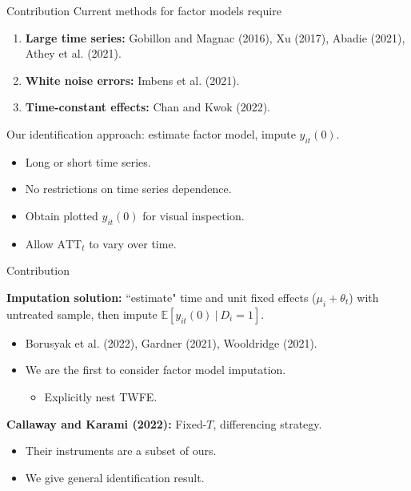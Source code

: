 \documentclass{beamer}
\newcommand{\1}{\mathds{1}} %
\newcommand{\condexpec}[2]{\mathbb{E}\left[#1 \ \vert \ #2\right]}
\begin{document}

\begin{frame}{Contribution}
        Current methods for factor models require
        \begin{enumerate}
            \item \textbf{Large time series:} Gobillon and Magnac (2016), Xu (2017), Abadie (2021), Athey et al. (2021).
            \item \textbf{White noise errors:} Imbens et al. (2021).
            \item \textbf{Time-constant effects:} Chan and Kwok (2022).
        \end{enumerate}

         \vspace{.5 cm}

         Our identification approach: estimate factor model, impute $y_{it}(0)$.
         \begin{itemize}
             \item Long or short time series. 
             \item No restrictions on time series dependence. 
             \item Obtain plotted $y_{it}(0)$ for visual inspection.
             \item Allow $\text{ATT}_t$ to vary over time. 
         \end{itemize}

         
\end{frame}


\begin{frame}{Contribution}

    \textbf{Imputation solution:} ``estimate" time and unit fixed effects ($\mu_i + \theta_t$) with untreated sample, then impute $\condexpec{y_{it}(0)}{D_i = 1}$.
    \begin{itemize}
        \item Borusyak et al. (2022), Gardner (2021), Wooldridge (2021).
        \item We are the first to consider factor model imputation.
        \begin{itemize}
            \item Explicitly nest TWFE.
        \end{itemize}
    \end{itemize}

    \vspace{.5cm}

         \textbf{Callaway and Karami (2022):} Fixed-$T$, differencing strategy. 
         \begin{itemize}
             \item Their instruments are a subset of ours. 
             \item We give general identification result.
         \end{itemize}
\end{frame}
\end{document}
